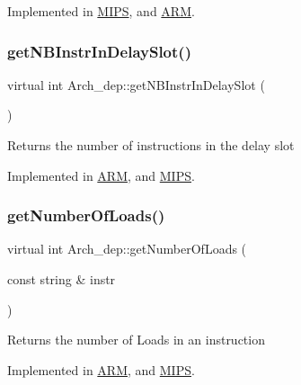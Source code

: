 Implemented in \hyperlink{classMIPS_ae09bc40a4598430935a4deb91e81703c}{M\+I\+PS}, and \hyperlink{classARM_a8dc99512e617606f2fb5386b59a8ae47}{A\+RM}.

\mbox{\label{classArch__dep_a7f9d441d7b402294c6faf7b81ee5aa59}} 
\subsubsection{\texorpdfstring{get\+N\+B\+Instr\+In\+Delay\+Slot()}{getNBInstrInDelaySlot()}}
{\footnotesize\ttfamily virtual int Arch\+\_\+dep\+::get\+N\+B\+Instr\+In\+Delay\+Slot (\begin{DoxyParamCaption}{ }\end{DoxyParamCaption})\hspace{0.3cm}{\ttfamily [pure virtual]}}

Returns the number of instructions in the delay slot 

Implemented in \hyperlink{classARM_a3df5e5b89546f7dfa9e50dc9f8c3518b}{A\+RM}, and \hyperlink{classMIPS_a15519e774487809038024a6cc0febab3}{M\+I\+PS}.

\mbox{\label{classArch__dep_a914556a124481b77698440f0cf6a5f24}} 
\subsubsection{\texorpdfstring{get\+Number\+Of\+Loads()}{getNumberOfLoads()}}
{\footnotesize\ttfamily virtual int Arch\+\_\+dep\+::get\+Number\+Of\+Loads (\begin{DoxyParamCaption}\item[{const string \&}]{instr }\end{DoxyParamCaption})\hspace{0.3cm}{\ttfamily [pure virtual]}}

Returns the number of Loads in an instruction 

Implemented in \hyperlink{classARM_afaa30a7fb0948c057acfc2673c4dc4c6}{A\+RM}, and \hyperlink{classMIPS_ad2447a7ac47005463a13e4e78dd55594}{M\+I\+PS}.

